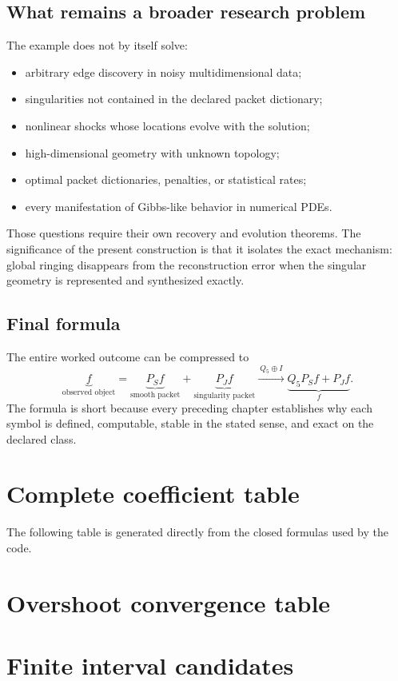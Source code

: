 \documentclass[11pt,oneside]{book}
\theoremstyle{remark}\newtheorem{remark}[theorem]{Remark}\newtheorem{boundary}[theorem]{Boundary}\newtheorem{certificate}[theorem]{Certificate}
\begin{document}
\section{What remains a broader research problem}
The example does not by itself solve:
\begin{itemize}
\item arbitrary edge discovery in noisy multidimensional data;
\item singularities not contained in the declared packet dictionary;
\item nonlinear shocks whose locations evolve with the solution;
\item high-dimensional geometry with unknown topology;
\item optimal packet dictionaries, penalties, or statistical rates;
\item every manifestation of Gibbs-like behavior in numerical PDEs.
\end{itemize}
Those questions require their own recovery and evolution theorems.  The significance of the present construction is that it isolates the exact mechanism: global ringing disappears from the reconstruction error when the singular geometry is represented and synthesized exactly.

\section{Final formula}
The entire worked outcome can be compressed to
\[
\boxed{
\underbrace{f}_{\text{observed object}}
=
\underbrace{P_Sf}_{\text{smooth packet}}
+
\underbrace{P_Jf}_{\text{singularity packet}}
\xrightarrow{\ Q_5\oplus I\ }
\underbrace{Q_5P_Sf+P_Jf}_{f}.
}
\]
The formula is short because every preceding chapter establishes why each symbol is defined, computable, stable in the stated sense, and exact on the declared class.

\appendix
\chapter{Complete coefficient table}
The following table is generated directly from the closed formulas used by the code.


\chapter{Overshoot convergence table}


\chapter{Finite interval candidates}

\end{document}
